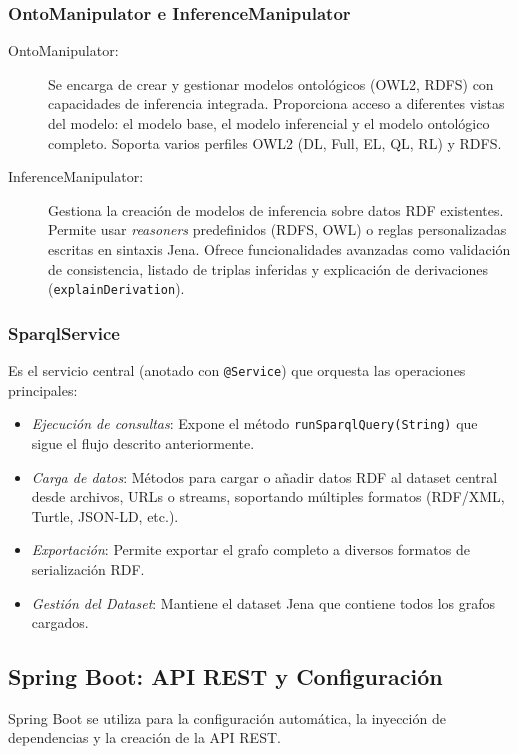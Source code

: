 \documentclass{article}
\begin{document}
\subsubsection{OntoManipulator e InferenceManipulator}
\begin{description}
    \item[OntoManipulator:] Se encarga de crear y gestionar modelos ontológicos (OWL2, RDFS) con capacidades de inferencia integrada. Proporciona acceso a diferentes vistas del modelo: el modelo base, el modelo inferencial y el modelo ontológico completo. Soporta varios perfiles OWL2 (DL, Full, EL, QL, RL) y RDFS.
    \item[InferenceManipulator:] Gestiona la creación de modelos de inferencia sobre datos RDF existentes. Permite usar \textit{reasoners} predefinidos (RDFS, OWL) o reglas personalizadas escritas en sintaxis Jena. Ofrece funcionalidades avanzadas como validación de consistencia, listado de triplas inferidas y explicación de derivaciones (\texttt{explainDerivation}).
\end{description}

\subsubsection{SparqlService}
Es el servicio central (anotado con \texttt{@Service}) que orquesta las operaciones principales:
\begin{itemize}
    \item \textit{Ejecución de consultas}: Expone el método \texttt{runSparqlQuery(String)} que sigue el flujo descrito anteriormente.
    \item \textit{Carga de datos}: Métodos para cargar o añadir datos RDF al dataset central desde archivos, URLs o streams, soportando múltiples formatos (RDF/XML, Turtle, JSON-LD, etc.).
    \item \textit{Exportación}: Permite exportar el grafo completo a diversos formatos de serialización RDF.
    \item \textit{Gestión del Dataset}: Mantiene el dataset Jena que contiene todos los grafos cargados.
\end{itemize}

\subsection{Spring Boot: API REST y Configuración}
Spring Boot se utiliza para la configuración automática, la inyección de dependencias y la creación de la API REST.
\end{document}
